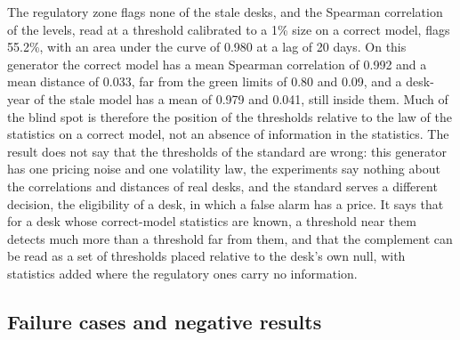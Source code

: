 The regulatory zone flags none of the stale desks, and the Spearman correlation of the levels, read at a threshold calibrated to a 1\% size on a correct model, flags 55.2\%, with an area under the curve of 0.980 at a lag of 20 days.
On this generator the correct model has a mean Spearman correlation of 0.992 and a mean distance of 0.033, far from the green limits of 0.80 and 0.09, and a desk-year of the stale model has a mean of 0.979 and 0.041, still inside them.
Much of the blind spot is therefore the position of the thresholds relative to the law of the statistics on a correct model, not an absence of information in the statistics.
The result does not say that the thresholds of the standard are wrong: this generator has one pricing noise and one volatility law, the experiments say nothing about the correlations and distances of real desks, and the standard serves a different decision, the eligibility of a desk, in which a false alarm has a price.
It says that for a desk whose correct-model statistics are known, a threshold near them detects much more than a threshold far from them, and that the complement can be read as a set of thresholds placed relative to the desk's own null, with statistics added where the regulatory ones carry no information.

\subsection{Failure cases and negative results}
\label{sec:discussion-failures}

